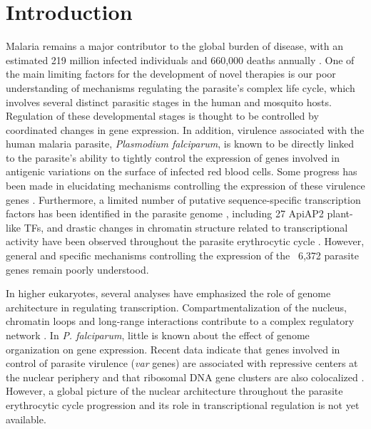\section*{Introduction}
Malaria remains a major contributor to the global burden of disease, with an estimated 219 million infected individuals and 660,000 deaths annually \citep{who:malaria}. One of the main limiting factors for the development of novel therapies is our poor understanding of mechanisms regulating the parasite's complex life cycle, which involves several distinct parasitic stages in the human and mosquito hosts. Regulation of these developmental stages is thought to be controlled by coordinated changes in gene expression. In addition, virulence associated with the human malaria parasite, {\em Plasmodium falciparum}, is known to be directly linked to the parasite's ability to tightly control the expression of genes involved in antigenic variations on the surface of infected red blood cells. Some progress has been made in elucidating mechanisms controlling the expression of these virulence genes \citep{duraisingh:heterochromatin, freitas-junior:telomeric}. Furthermore, a limited number of putative sequence-specific transcription factors has been identified in the parasite genome \citep{balaji:discovery, coulson:comparative}, including 27 ApiAP2 plant-like TFs, and drastic changes in chromatin structure related to transcriptional activity have been observed throughout the parasite erythrocytic cycle \citep{ponts:nucleosome}. However, general and specific mechanisms controlling the expression of the ~6,372 parasite genes remain poorly understood.

In higher eukaryotes, several analyses have emphasized the role of genome architecture in regulating transcription. Compartmentalization of the nucleus, chromatin loops and long-range interactions contribute to a complex regulatory network \citep{homouz:3d, kalhor:genome,  lieberman-aiden:comprehensive, dixon:topological}. In {\em P. falciparum}, little is known about the effect of genome organization on gene expression. Recent data indicate that genes involved in control of parasite virulence ({\em var} genes) are associated with repressive centers at the nuclear periphery \citep{duraisingh:heterochromatin, dzikowski:mechanisms, lopez-rubio:genome-wide} and that ribosomal DNA gene clusters are also colocalized \citep{mancio-silva:clustering, lemieux:genome-wide}. However, a global picture of the nuclear architecture throughout the parasite erythrocytic cycle progression and its role in transcriptional regulation is not yet available.

